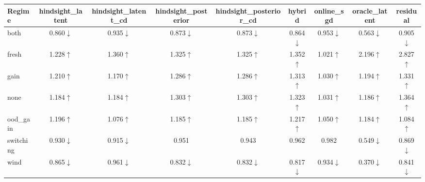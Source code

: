 \begin{tabular}{lcccccccc}
\toprule
Regime & hindsight\_latent & hindsight\_latent\_cd & hindsight\_posterior & hindsight\_posterior\_cd & hybrid & online\_sgd & oracle\_latent & residual \\
\midrule
both & 0.860$\downarrow$ & 0.935$\downarrow$ & 0.873$\downarrow$ & 0.873$\downarrow$ & 0.864$\downarrow$ & 0.953$\downarrow$ & 0.563$\downarrow$ & 0.905$\downarrow$ \\
fresh & 1.228$\uparrow$ & 1.360$\uparrow$ & 1.325$\uparrow$ & 1.325$\uparrow$ & 1.352$\uparrow$ & 1.021$\uparrow$ & 2.196$\uparrow$ & 2.827$\uparrow$ \\
gain & 1.210$\uparrow$ & 1.170$\uparrow$ & 1.286$\uparrow$ & 1.286$\uparrow$ & 1.313$\uparrow$ & 1.030$\uparrow$ & 1.194$\uparrow$ & 1.331$\uparrow$ \\
none & 1.184$\uparrow$ & 1.184$\uparrow$ & 1.303$\uparrow$ & 1.303$\uparrow$ & 1.323$\uparrow$ & 1.031$\uparrow$ & 1.186$\uparrow$ & 1.364$\uparrow$ \\
ood\_gain & 1.196$\uparrow$ & 1.076$\uparrow$ & 1.185$\uparrow$ & 1.185$\uparrow$ & 1.217$\uparrow$ & 1.050$\uparrow$ & 1.184$\uparrow$ & 1.084$\uparrow$ \\
switching & 0.930$\downarrow$ & 0.915$\downarrow$ & 0.951 & 0.943 & 0.962 & 0.982 & 0.549$\downarrow$ & 0.869$\downarrow$ \\
wind & 0.865$\downarrow$ & 0.961$\downarrow$ & 0.832$\downarrow$ & 0.832$\downarrow$ & 0.817$\downarrow$ & 0.934$\downarrow$ & 0.370$\downarrow$ & 0.841$\downarrow$ \\
\bottomrule
\end{tabular}
